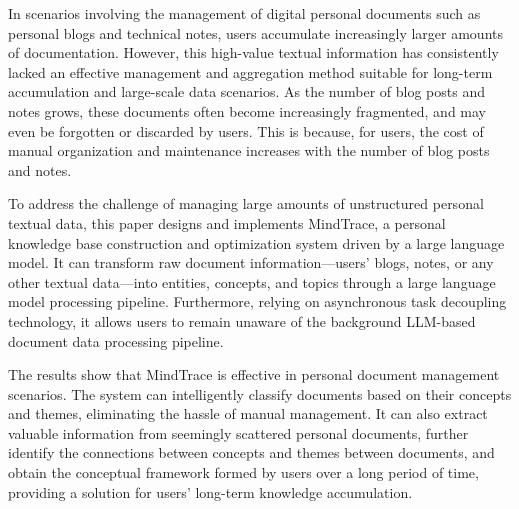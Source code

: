 {}

\begin{abstracten}
    In scenarios involving the management of digital personal documents such as personal blogs and technical notes, users accumulate increasingly larger amounts of documentation. However, this high-value textual information has consistently lacked an effective management and aggregation method suitable for long-term accumulation and large-scale data scenarios. As the number of blog posts and notes grows, these documents often become increasingly fragmented, and may even be forgotten or discarded by users. This is because, for users, the cost of manual organization and maintenance increases with the number of blog posts and notes.

    To address the challenge of managing large amounts of unstructured personal textual data, this paper designs and implements MindTrace, a personal knowledge base construction and optimization system driven by a large language model. It can transform raw document information—users' blogs, notes, or any other textual data—into entities, concepts, and topics through a large language model processing pipeline. Furthermore, relying on asynchronous task decoupling technology, it allows users to remain unaware of the background LLM-based document data processing pipeline.

    The results show that MindTrace is effective in personal document management scenarios. The system can intelligently classify documents based on their concepts and themes, eliminating the hassle of manual management. It can also extract valuable information from seemingly scattered personal documents, further identify the connections between concepts and themes between documents, and obtain the conceptual framework formed by users over a long period of time, providing a solution for users' long-term knowledge accumulation.
\end{abstracten}
